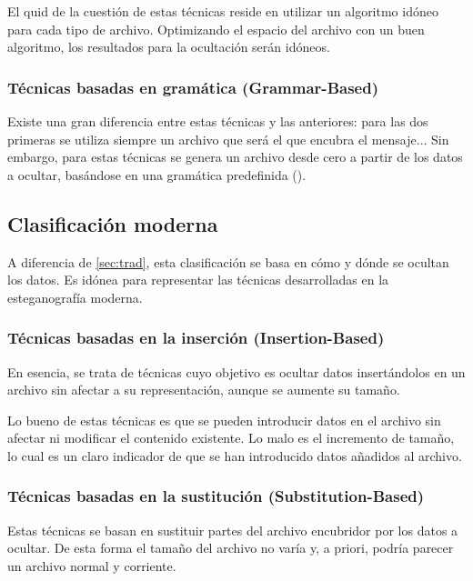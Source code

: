 El quid de la cuestión de estas técnicas reside en utilizar un algoritmo idóneo para cada tipo de archivo. Optimizando el espacio del archivo con un buen algoritmo, los resultados para la ocultación serán idóneos.

\subsubsection{Técnicas basadas en gramática (Grammar-Based)}

Existe una gran diferencia entre estas técnicas y las anteriores: para las dos primeras se utiliza siempre un archivo que será el que encubra el mensaje... Sin embargo, para estas técnicas se genera un archivo desde cero a partir de los datos a ocultar, basándose en una gramática predefinida (\cite{esteganografia-digital}). %

\subsection{Clasificación moderna}

A diferencia de \ref{sec:trad}, esta clasificación se basa en cómo y dónde se ocultan los datos. Es idónea para representar las técnicas desarrolladas en la esteganografía moderna.

\subsubsection{Técnicas basadas en la inserción (Insertion-Based)}

En esencia, se trata de técnicas cuyo objetivo es ocultar datos insertándolos en un archivo sin afectar a su representación, aunque se aumente su tamaño.

Lo bueno de estas técnicas es que se pueden introducir datos en el archivo sin afectar ni modificar el contenido existente. Lo malo es el incremento de tamaño, lo cual es un claro indicador de que se han introducido datos añadidos al archivo.

\subsubsection{Técnicas basadas en la sustitución (Substitution-Based)}

Estas técnicas se basan en sustituir partes del archivo encubridor por los datos a ocultar. De esta forma el tamaño del archivo no varía y, a priori, podría parecer un archivo normal y corriente.


